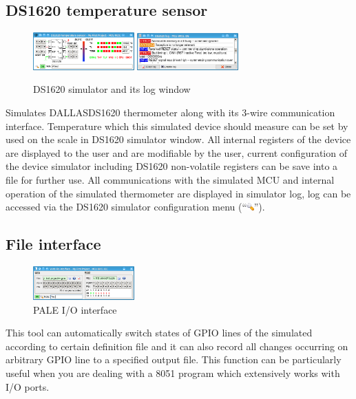 \documentclass[a4paper,twoside,12pt]{book}
\begin{document}
		\subsection{DS1620 temperature sensor}
			\begin{figure}
				\centering{}
				\includegraphics[width=110pt]{img/049.png}
				\includegraphics[width=110pt]{img/050.png}
				\caption{DS1620 simulator and its log window}
			\end{figure}
			Simulates DALLAS\textregistered DS1620 thermometer along with its 3-wire communication interface. Temperature which this simulated device should measure can be set by used on the scale in DS1620 simulator window. All internal registers of the device are displayed to the user and are modifiable by the user, current configuration of the device simulator including DS1620 non-volatile registers can be save into a file for further use. All communications with the simulated MCU and internal operation of the simulated thermometer are displayed in simulator log, log can be accessed via the DS1620 simulator configuration menu (``\includegraphics[height=8pt]{img/configure.png}'').


		\subsection{File interface}
			\begin{figure}
				\centering{}
				\includegraphics[width=110pt]{img/048.png}
				\caption{PALE I/O interface}
			\end{figure}
			This tool can automatically switch states of GPIO lines of the simulated according to certain definition file and it can also record all changes occurring on arbitrary GPIO line to a specified output file. This function can be particularly useful when you are dealing with a 8051 program which extensively works with I/O ports.
\end{document}
